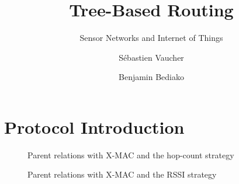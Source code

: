 \documentclass[a4paper]{llncs}
\begin{document}
\title{Tree-Based Routing}


\subtitle{Sensor Networks and Internet of Things}

\author{Sébastien Vaucher \and Benjamin Bediako}






\maketitle


\section{Protocol Introduction}

\begin{figure}
	\centering
	
	\caption{Parent relations with X-MAC and the hop-count strategy}
	\label{fig:map-hopcount}
\end{figure}

\begin{figure}
	\centering
	
	\caption{Parent relations with X-MAC and the RSSI strategy}
	\label{fig:map-rssi}
\end{figure}

\printbibliography
\end{document}

